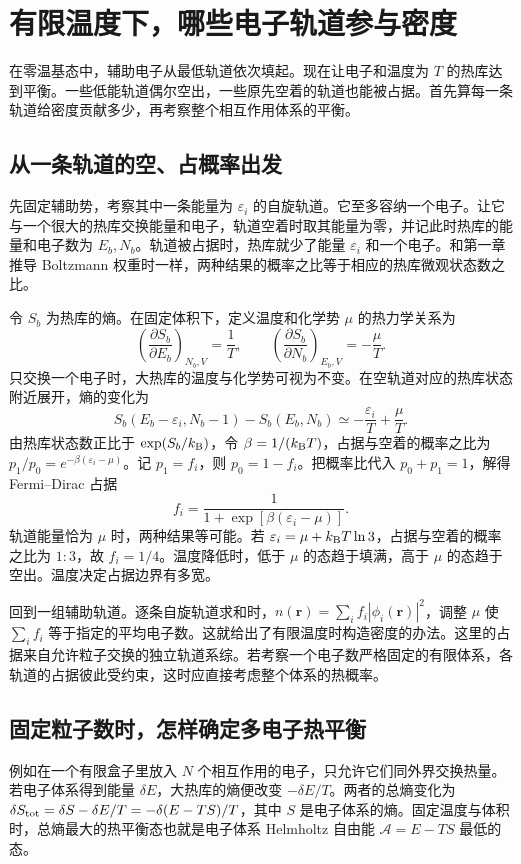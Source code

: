 \section{有限温度下，哪些电子轨道参与密度}
在零温基态中，辅助电子从最低轨道依次填起。现在让电子和温度为 $T$ 的热库达到平衡。一些低能轨道偶尔空出，一些原先空着的轨道也能被占据。首先算每一条轨道给密度贡献多少，再考察整个相互作用体系的平衡。

\subsection{从一条轨道的空、占概率出发}
先固定辅助势，考察其中一条能量为 $\varepsilon_i$ 的自旋轨道。它至多容纳一个电子。让它与一个很大的热库交换能量和电子，轨道空着时取其能量为零，并记此时热库的能量和电子数为 $E_b,N_b$。轨道被占据时，热库就少了能量 $\varepsilon_i$ 和一个电子。和第一章推导 Boltzmann 权重时一样，两种结果的概率之比等于相应的热库微观状态数之比。

令 $S_b$ 为热库的熵。在固定体积下，定义温度和化学势 $\mu$ 的热力学关系为
\[
 \left(\frac{\partial S_b}{\partial E_b}\right)_{N_b,V}=\frac1T,\qquad
 \left(\frac{\partial S_b}{\partial N_b}\right)_{E_b,V}=-\frac{\mu}{T}.
\]
只交换一个电子时，大热库的温度与化学势可视为不变。在空轨道对应的热库状态附近展开，熵的变化为
\[
 S_b(E_b-\varepsilon_i,N_b-1)-S_b(E_b,N_b)
 \simeq-\frac{\varepsilon_i}{T}+\frac{\mu}{T}.
\]
由热库状态数正比于 $\exp(S_b/k_{\mathrm B})$，令 $\beta=1/(k_{\mathrm B} T)$，占据与空着的概率之比为 $p_1/p_0=e^{-\beta(\varepsilon_i-\mu)}$。记 $p_1=f_i$，则 $p_0=1-f_i$。把概率比代入 $p_0+p_1=1$，解得 Fermi--Dirac 占据
\begin{equation}\label{dft:fermi-occupation}
 f_i=\frac{1}{1+\exp[\beta(\varepsilon_i-\mu)]}.
\end{equation}
轨道能量恰为 $\mu$ 时，两种结果等可能。若 $\varepsilon_i=\mu+k_{\mathrm B} T\ln3$，占据与空着的概率之比为 $1:3$，故 $f_i=1/4$。温度降低时，低于 $\mu$ 的态趋于填满，高于 $\mu$ 的态趋于空出。温度决定占据边界有多宽。

回到一组辅助轨道。逐条自旋轨道求和时，$n(\bm r)=\sum_i f_i|\phi_i(\bm r)|^2$，调整 $\mu$ 使 $\sum_i f_i$ 等于指定的平均电子数。这就给出了有限温度时构造密度的办法。这里的占据来自允许粒子交换的独立轨道系综。若考察一个电子数严格固定的有限体系，各轨道的占据彼此受约束，这时应直接考虑整个体系的热概率。

\subsection{固定粒子数时，怎样确定多电子热平衡}
例如在一个有限盒子里放入 $N$ 个相互作用的电子，只允许它们同外界交换热量。若电子体系得到能量 $\delta E$，大热库的熵便改变 $-\delta E/T$。两者的总熵变化为 $\delta S_{\rm tot}=\delta S-\delta E/T=-\delta(E-TS)/T$，其中 $S$ 是电子体系的熵。固定温度与体积时，总熵最大的热平衡态也就是电子体系 Helmholtz 自由能 $\mathcal A=E-TS$ 最低的态。

